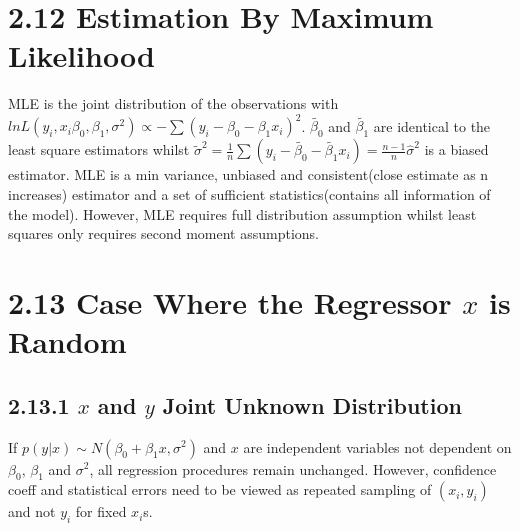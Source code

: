 \begin{multicols*}{3}
\section{2.12 Estimation By Maximum Likelihood}
MLE is the joint distribution of the observations with $ln L(y_i, x_i \beta_0, \beta_1, \sigma^2) \propto - \sum(y_i - \beta_0 - \beta_1 x_i)^2$. $\tilde{\beta_0}$ and $\tilde{\beta_1}$ are identical to the least square estimators whilst $\tilde{\sigma}^2 = \frac{1}{n}\sum(y_i - \tilde{\beta_0} - \tilde{\beta_1}x_i) = \frac{n - 1}{n} \hat{\sigma}^2$ is a biased estimator. MLE is a min variance, unbiased and consistent(close estimate as n increases) estimator and a set of sufficient statistics(contains all information of the model). However, MLE requires full distribution assumption whilst least squares only requires second moment assumptions.

\section{2.13 Case Where the Regressor $x$ is Random}
\subsection{2.13.1 $x$ and $y$ Joint Unknown Distribution}
If $p(y|x) \sim N(\beta_0 + \beta_1x, \sigma^2)$ and $x$ are independent variables not dependent on $\beta_0$, $\beta_1$ and $\sigma^2$, all regression procedures remain unchanged. However, confidence coeff and statistical errors need to be viewed as repeated sampling of $(x_i, y_i)$ and not $y_i$ for fixed $x_i$s. 


\end{multicols*}
